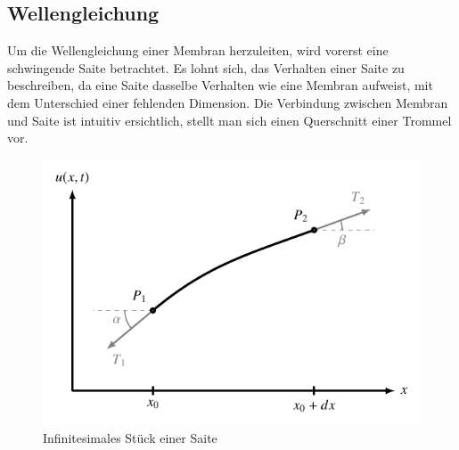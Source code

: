 \subsection{Wellengleichung}
Um die Wellengleichung einer Membran herzuleiten, wird vorerst eine schwingende Saite betrachtet.
%
Es lohnt sich, das Verhalten einer Saite zu beschreiben, da eine Saite dasselbe Verhalten wie eine Membran aufweist, mit dem Unterschied einer fehlenden Dimension.
Die Verbindung zwischen Membran und Saite ist intuitiv ersichtlich, stellt man sich einen Querschnitt einer Trommel vor.
\begin{figure}
	
	\begin{center}		
		\includegraphics[]{papers/kreismembran/images/TikzSaite.pdf}
		\caption{Infinitesimales Stück einer Saite}
		\label{kreismembran:im:Saite}
	\end{center}	
\end{figure}

